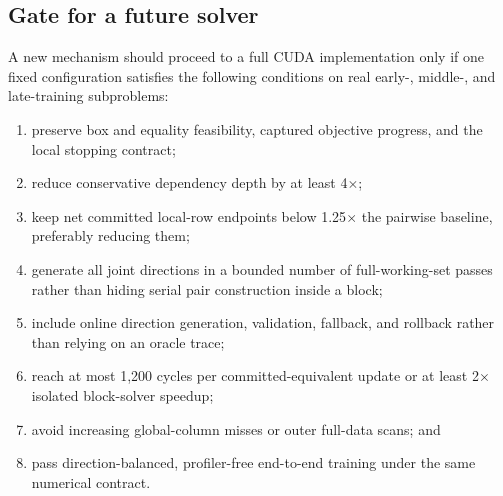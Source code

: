 \subsection{Gate for a future solver}

A new mechanism should proceed to a full CUDA implementation only if one fixed
configuration satisfies the following conditions on real early-, middle-, and
late-training subproblems:

\begin{enumerate}
  \item preserve box and equality feasibility, captured objective progress,
        and the local stopping contract;
  \item reduce conservative dependency depth by at least 4$\times$;
  \item keep net committed local-row endpoints below 1.25$\times$ the pairwise
        baseline, preferably reducing them;
  \item generate all joint directions in a bounded number of full-working-set
        passes rather than hiding serial pair construction inside a block;
  \item include online direction generation, validation, fallback, and
        rollback rather than relying on an oracle trace;
  \item reach at most 1,200 cycles per committed-equivalent update or at least
        2$\times$ isolated block-solver speedup;
  \item avoid increasing global-column misses or outer full-data scans; and
  \item pass direction-balanced, profiler-free end-to-end training under the
        same numerical contract.
\end{enumerate}
